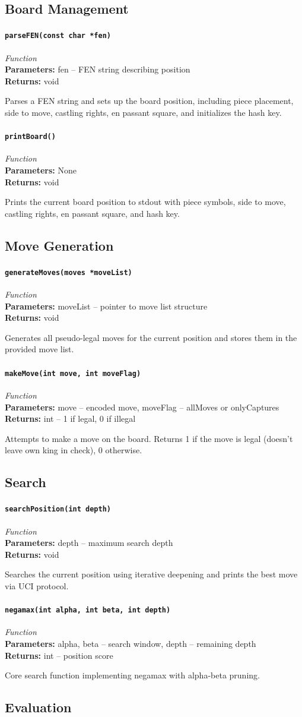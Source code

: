 \documentclass[11pt,a4paper]{report}
\newcommand{\function}[4]{%
    \paragraph{\texttt{#1}} \hfill \textit{#2}\\
    \textbf{Parameters:} #3\\
    \textbf{Returns:} #4
}
\begin{document}
\subsection{Board Management}

\function{parseFEN(const char *fen)}{Function}{fen -- FEN string describing position}{void}

Parses a FEN string and sets up the board position, including piece placement, side to move, castling rights, en passant square, and initializes the hash key.

\function{printBoard()}{Function}{None}{void}

Prints the current board position to stdout with piece symbols, side to move, castling rights, en passant square, and hash key.

\subsection{Move Generation}

\function{generateMoves(moves *moveList)}{Function}{moveList -- pointer to move list structure}{void}

Generates all pseudo-legal moves for the current position and stores them in the provided move list.

\function{makeMove(int move, int moveFlag)}{Function}{move -- encoded move, moveFlag -- allMoves or onlyCaptures}{int -- 1 if legal, 0 if illegal}

Attempts to make a move on the board. Returns 1 if the move is legal (doesn't leave own king in check), 0 otherwise.

\subsection{Search}

\function{searchPosition(int depth)}{Function}{depth -- maximum search depth}{void}

Searches the current position using iterative deepening and prints the best move via UCI protocol.

\function{negamax(int alpha, int beta, int depth)}{Function}{alpha, beta -- search window, depth -- remaining depth}{int -- position score}

Core search function implementing negamax with alpha-beta pruning.

\subsection{Evaluation}
\end{document}
